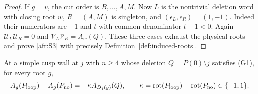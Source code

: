 \begin{proof}
If $g=v$, the cut order is $B,\ldots,A,M$.  Now $L$ is the
nontrivial deletion word with closing root $w$, $R=(A,M)$ is
singleton, and $(\epsilon_L,\epsilon_R)=(1,-1)$.
Indeed their numerators are $-1$ and $t$ with common denominator
$t-1<0$.  Again $\mathcal U_L\mathcal U_R=0$ and $\mathcal V_L\mathcal V_R=A_w(Q)$.
These three cases exhaust the physical roots and prove
\eqref{afr:S3} with precisely Definition~\ref{def:induced-roots}.
\end{proof}

\begin{theorem}\label{thm:A-S4}
At a simple cusp wall at $j$ with $n\geq4$ whose deletion
$Q=P(0)\setminus j$ satisfies (G1), for every root $g$,
\begin{equation}\label{afr:S4}
A_g(P_{\rm loop})-A_g(P_{\rm no})
=-\kappa A_{D_j(g)}(Q),\qquad
\kappa=\operatorname{rot}(P_{\rm loop})-\operatorname{rot}(P_{\rm no})\in\{-1,1\}.
\end{equation}
\end{theorem}
